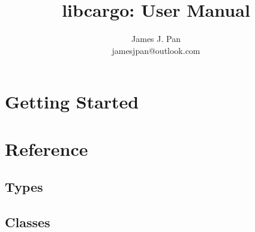 \documentclass[11pt]{article}
\title{libcargo: User Manual}
\author{
    James J. Pan \\
    jamesjpan@outlook.com
}
\begin{document}
\maketitle

\tableofcontents

\section{Getting Started}

\section{Reference}

\subsection{Types}

\subsection{Classes}
\end{document}
